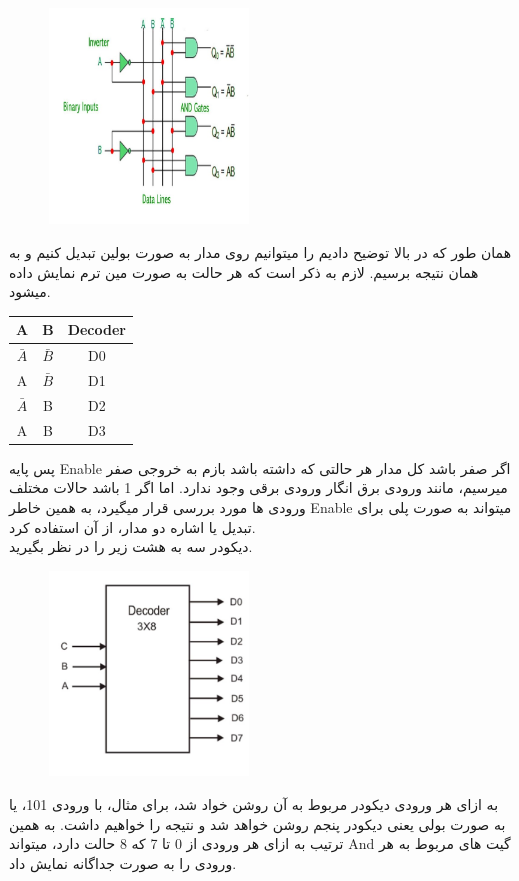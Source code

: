 \documentclass[20pt, a4paper]{article}
\begin{document}
\begin{figure}[htbp]\centering
	\centerline{\includegraphics[width=150pt]{img/lastest/decoder1.jpg}}
\end{figure}
همان طور که در بالا توضیح دادیم را میتوانیم روی مدار به صورت بولین تبدیل کنیم و به همان نتیجه برسیم.
لازم به ذکر است که هر حالت به صورت مین ترم نمایش داده میشود.

\begin{LTR}
	\begin{tabular}{ c c | c  }
		A & B & Decoder \\
		\hline
		$\bar{A}$ & $\bar{B}$ & D0\\ 			
		A & $\bar{B}$ & D1\\
		$\bar{A}$ & B & D2\\
		A & B & D3
	\end{tabular}
\end{LTR}
\hfill \break

پس پایه Enable
اگر صفر باشد کل مدار هر حالتی که داشته باشد بازم به خروجی صفر
میرسیم، مانند ورودی برق انگار ورودی برقی وجود ندارد.
اما اگر 1 باشد حالات مختلف ورودی ها مورد بررسی قرار میگیرد، به همین 
خاطر Enable
میتواند به صورت پلی برای تبدیل یا اشاره دو مدار، از آن استفاده کرد.\\


دیکودر سه به هشت زیر را در نظر بگیرید.
\begin{figure}[htbp]\centering
	\centerline{\includegraphics[width=150pt]{img/lastest/decoder3to8.jpg}}
\end{figure}
به ازای هر ورودی دیکودر مربوط به آن روشن خواد شد، برای مثال،
با ورودی 101، یا به صورت بولی یعنی 
دیکودر پنجم روشن خواهد شد و نتیجه 
را خواهیم داشت.
به همین ترتیب به ازای هر ورودی از 0 تا 7 که 8 حالت دارد، میتواند And
گیت های مربوط به هر ورودی را به صورت جداگانه نمایش داد.
\newpage
\end{document}
